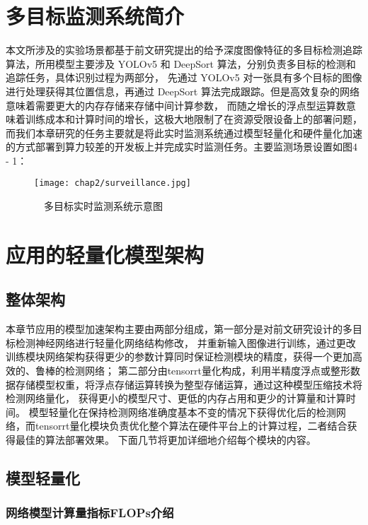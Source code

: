 \section{多目标监测系统简介}
\label{sec4-2}
本文所涉及的实验场景都基于前文研究提出的给予深度图像特征的多目标检测追踪算法，所用模型主要涉及 YOLOv5 和 DeepSort 算法，分别负责多目标的检测和追踪任务，具体识别过程为两部分，
先通过 YOLOv5 对一张具有多个目标的图像进行处理获得其位置信息，再通过 DeepSort 算法完成跟踪。但是高效复杂的网络意味着需要更大的内存存储来存储中间计算参数，
而随之增长的浮点型运算数意味着训练成本和计算时间的增长，这极大地限制了在资源受限设备上的部署问题，
而我们本章研究的任务主要就是将此实时监测系统通过模型轻量化和硬件量化加速的方式部署到算力较差的开发板上并完成实时监测任务。主要监测场景设置如图4 - 1：
\vspace{6mm}
\begin{figure}[h]
	\centering
	\texttt{[image: chap2/surveillance.jpg]}
	\caption{\ \ 多目标实时监测系统示意图}
	\label{fig4-1}
\end{figure}
\vspace{3mm}

\section{应用的轻量化模型架构}
\label{sec4-3}
\subsection{整体架构}
本章节应用的模型加速架构主要由两部分组成，第一部分是对前文研究设计的多目标检测神经网络进行轻量化网络结构修改，
并重新输入图像进行训练，通过更改训练模块网络架构获得更少的参数计算同时保证检测模块的精度，获得一个更加高效的、鲁棒的检测网络；
第二部分由tensorrt量化构成，利用半精度浮点或整形数据存储模型权重，将浮点存储运算转换为整型存储运算，通过这种模型压缩技术将检测网络量化，
获得更小的模型尺寸、更低的内存占用和更少的计算量和计算时间。
模型轻量化在保持检测网络准确度基本不变的情况下获得优化后的检测网络，而tensorrt量化模块负责优化整个算法在硬件平台上的计算过程，二者结合获得最佳的算法部署效果。
下面几节将更加详细地介绍每个模块的内容。

\subsection{模型轻量化}

\subsubsection{网络模型计算量指标FLOPs介绍}

